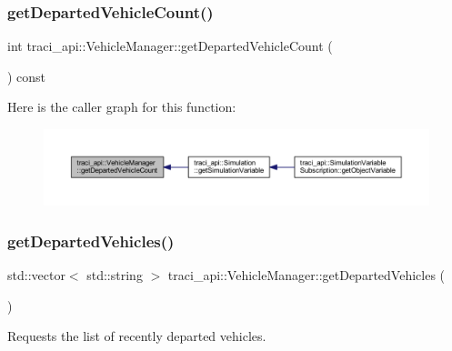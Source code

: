 \subsubsection{\texorpdfstring{get\+Departed\+Vehicle\+Count()}{getDepartedVehicleCount()}}
{\footnotesize\ttfamily int traci\+\_\+api\+::\+Vehicle\+Manager\+::get\+Departed\+Vehicle\+Count (\begin{DoxyParamCaption}{ }\end{DoxyParamCaption}) const}

Here is the caller graph for this function\+:\nopagebreak
\begin{figure}[H]
\begin{center}
\leavevmode
\includegraphics[width=350pt]{classtraci__api_1_1_vehicle_manager_a707b94f1d1f82a35263ae130a0573f77_icgraph}
\end{center}
\end{figure}
\mbox{\label{classtraci__api_1_1_vehicle_manager_ae88de975fe459842df9a412c552641ea}} 
\subsubsection{\texorpdfstring{get\+Departed\+Vehicles()}{getDepartedVehicles()}}
{\footnotesize\ttfamily std\+::vector$<$ std\+::string $>$ traci\+\_\+api\+::\+Vehicle\+Manager\+::get\+Departed\+Vehicles (\begin{DoxyParamCaption}{ }\end{DoxyParamCaption})}



Requests the list of recently departed vehicles. 

